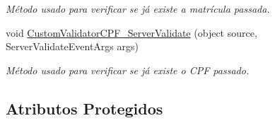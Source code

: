 \begin{DoxyCompactItemize}
\begin{DoxyCompactList}\small\item\em Método usado para verificar se já existe a matrícula passada. \item\end{DoxyCompactList}\item 
void \hyperlink{class_sistema_r_h_1_1_cadastro_docs_a1f6b6377443c6dc8d4b7616f98aaef1b}{CustomValidatorCPF\_\-ServerValidate} (object source, ServerValidateEventArgs args)
\begin{DoxyCompactList}\small\item\em Método usado para verificar se já existe o CPF passado. \item\end{DoxyCompactList}\end{DoxyCompactItemize}
\subsection*{Atributos Protegidos}
